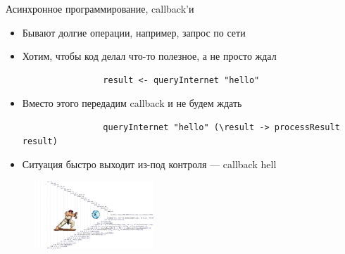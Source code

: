     \begin{frame}[fragile]{Асинхронное программирование, callback'и}
        \begin{itemize}
            \item Бывают долгие операции, например, запрос по сети
            \item Хотим, чтобы код делал что-то полезное, а не просто ждал
            \begin{verbatim}
                result <- queryInternet "hello"
            \end{verbatim}
            \item Вместо этого передадим callback и не будем ждать
            \begin{verbatim}
                queryInternet "hello" (\result -> processResult result)
            \end{verbatim}
            \item Ситуация быстро выходит из-под контроля --- callback hell
        \end{itemize}
        \begin{figure}[h]
            \centering
            \includegraphics[width=0.4\textwidth]{figs/callback-hell}
        \end{figure}
    \end{frame}

